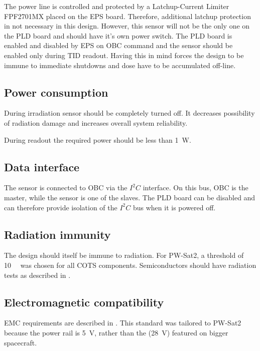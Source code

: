         The power line is controlled and protected by a Latchup-Current Limiter FPF2701MX placed on the EPS board. Therefore, additional latchup protection in not necessary in this design. However, this sensor will not be the only one on the PLD board and should have it's own power switch. The PLD board is enabled and disabled by EPS on OBC command and the sensor should be enabled only during TID readout. Having this in mind forces the design to be immune to immediate shutdowns and dose have to be accumulated off-line.

    \subsection{Power consumption}
        During irradiation sensor should be completely turned off. It decreases possibility of radiation damage and increases overall system reliability.

        During readout the required power should be less than \SI{1}{W}.

    \subsection{Data interface}
        The sensor is connected to OBC via the $I^2C$ interface. On this bus, OBC is the master, while the sensor is one of the slaves. The PLD board can be disabled and can therefore provide isolation of the $I^2C$ bus when it is powered off.

    \subsection{Radiation immunity}
        The design should itself be immune to radiation. For PW-Sat2, a threshold of \SI{10}{\kilo\rad} was chosen for all COTS components. Semiconductors should have radiation tests as described in \cite{ESCIES_TID_test_method}.

    \subsection{Electromagnetic compatibility}
        EMC requirements are described in \cite{ECSS_E_ST_20_07C}. This standard was tailored to PW-Sat2 because the power rail is \SI{+5}{\volt}, rather than the (\SI{+28}{\volt}) featured on bigger spacecraft.

